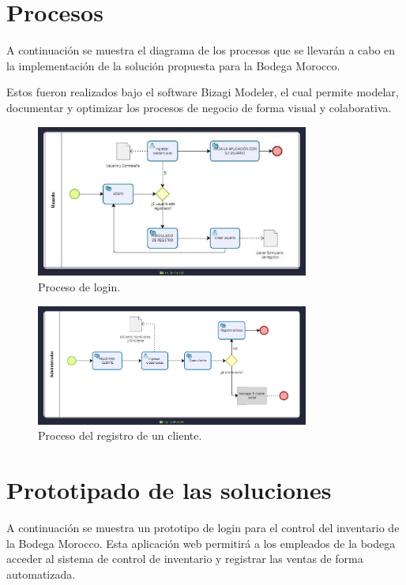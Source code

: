 \documentclass{article}
\begin{document}
\newpage

\section{Procesos}

A continuación se muestra el diagrama de los procesos que se llevarán a cabo en la implementación de la solución propuesta para la Bodega Morocco.

Estos fueron realizados bajo el software Bizagi Modeler, el cual permite modelar, documentar y optimizar los procesos de negocio de forma visual y colaborativa.

\begin{figure}[H]
  \centering
  \includegraphics[width=0.8\textwidth]{./assets/p-login.png}
  \caption{Proceso de login.}
\end{figure}

\begin{figure}[H]
  \centering
  \includegraphics[width=0.8\textwidth]{./assets/p-clientes.png}
  \caption{Proceso del registro de un cliente.}
\end{figure}

\newpage

\section{Prototipado de las soluciones}

A continuación se muestra un prototipo de login para el control del inventario de la Bodega Morocco. Esta aplicación web permitirá a los empleados de la bodega acceder al sistema de control de inventario y registrar las ventas de forma automatizada.
\end{document}
